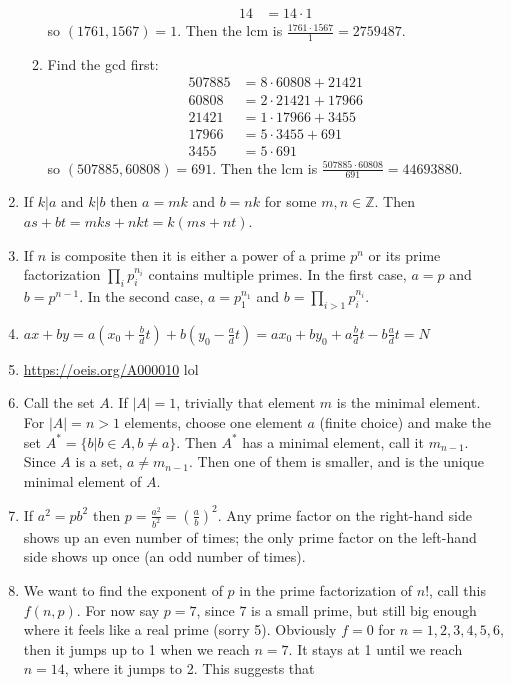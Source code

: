 \documentclass[]{article}
\newcommand{\abs}[1]{\left\vert #1 \right\vert}
\newcommand{\bbz}{\mathbb{Z}}
\begin{document}
\begin{enumerate}
\begin{enumerate}
\begin{align}
14 &= 14\cdot 1
\end{align}
so $(1761,1567) = 1$. Then the lcm is $\frac{1761\cdot 1567}{1} = 2759487$.
\item Find the gcd first:
\begin{align}
507885 &= 8\cdot 60808 + 21421 \\
60808 &= 2\cdot 21421 + 17966 \\
21421 &= 1\cdot 17966 + 3455 \\
17966 &= 5\cdot 3455 + 691 \\
3455 &= 5\cdot 691
\end{align}
so $(507885,60808) = 691$. Then the lcm is $\frac{507885\cdot 60808}{691} = 44693880$.
\end{enumerate}
\item If $k \vert a$ and $k \vert b$ then $a = mk$ and $b = nk$ for some $m,n\in\bbz$. Then $as+bt = mks + nkt = k(ms+nt)$.
\item If $n$ is composite then it is either a power of a prime $p^n$ or its prime factorization $\prod_i p_i^{n_i}$ contains multiple primes. In the first case, $a = p$ and $b = p^{n-1}$. In the second case, $a = p_1^{n_1}$ and $b = \prod_{i>1}p_i^{n_i}$.
\item $ax + by = a\left(x_0 + \frac{b}{d}t\right) + b\left(y_0 - \frac{a}{d}t\right) = ax_0 + by_0 + a\frac{b}{d}t - b\frac{a}{d}t = N$
\item \url{https://oeis.org/A000010} lol
\item Call the set $A$. If $\abs{A}=1$, trivially that element $m$ is the minimal element. For $\abs{A}=n>1$ elements, choose one element $a$ (finite choice) and make the set $A^* = \{b \vert b\in A, b\neq a \}$. Then $A^*$ has a minimal element, call it $m_{n-1}$. Since $A$ is a set, $a \neq m_{n-1}$. Then one of them is smaller, and is the unique minimal element of $A$.
\item If $a^2 = pb^2$ then $p = \frac{a^2}{b^2} = \left(\frac{a}{b}\right)^2$. Any prime factor on the right-hand side shows up an even number of times; the only prime factor on the left-hand side shows up once (an odd number of times).
\item We want to find the exponent of $p$ in the prime factorization of $n!$, call this $f(n,p)$. For now say $p=7$, since $7$ is a small prime, but still big enough where it feels like a real prime (sorry 5). Obviously $f = 0$ for $n=1,2,3,4,5,6$, then it jumps up to 1 when we reach $n=7$. It stays at 1 until we reach $n=14$, where it jumps to 2. This suggests that
\begin{equation}

\end{equation}
\end{enumerate}
\end{document}
